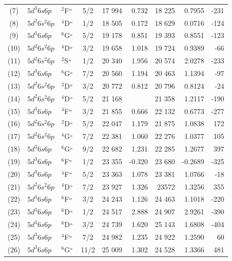 \documentclass[8pt,a4paper, twoside]{report}
\begin{document}
\begin{table}[p!]
\begin{center}
\begin{tabular}{cl@{\hspace{0.5cm}}l@{\hspace{0.5cm}}c@{\hspace{0.5cm}}r@{\hspace{0.5cm}}r@{\hspace{0.5cm}}r@{\hspace{0.5cm}}r@{\hspace{0.5cm}}r}
(7)  &$5d^3 6s 6p$ & $^2$F$^{\rm_o}$  & 5/2 & 17 994 & 0.732 &  18 225 &   0.7955  & -231\\
(8)  &$5d^2 6s^2 6p$ & $^4$D$^{\rm_o}$  & 1/2 & 18 505 & 0.172 & 18 629 &   0.0716  & -124\\
(9)  &$5d^3 6s 6p$ & $^6$G$^{\rm_o}$  & 5/2 & 19 178 & 0.851 & 19 393 &   0.8551 &  -123\\
(10)  &$5d^2 6s^2 6p$ & $^4$D$^{\rm_o}$  & 3/2 & 19 658 & 1.018 & 19 724 &   0.9389 & -66\\
(11)  &$5d^2 6s^2 6p$ & $^2$S$^{\rm_o}$  & 1/2 & 20 340 & 1.956 & 20 574 &   2.0278 & -233\\
(12)  &$5d^3 6s 6p$ & $^6$G$^{\rm_o}$  & 7/2 & 20 560 & 1.194 & 20 463 &   1.1394 & -97\\
(13)  &$5d^2 6s^2 6p$ & $^2$D$^{\rm_o}$  & 3/2 & 20 772 & 0.812 & 20 796 &     0.8124 & -24\\
(14)  &$5d^2 6s^2 6p$ & $^4$D$^{\rm_o}$  & 5/2 & 21 168 &   & 21 358 &   1.2117 &  -190\\
(15)  &$5d^3 6s 6p$ & $^4$F$^{\rm_o}$ & 3/2 & 21 855 & 0.666 & 22 132 & 0.6773 & -277 \\
(16)  &$5d^2 6s^2 6p$ & $^2$D$^{\rm_o}$ & 5/2 & 22 047 & 1.179 & 21 875 & 1.0838 & 172 \\
(17)  &$5d^2 6s^2 6p$ & $^4$G$^{\rm_o}$  & 7/2 & 22 381 & 1.060 & 22 276 & 1.0377 & 105 \\
(18)  &$5d^3 6s 6p$ & $^6$G$^{\rm_o}$ & 9/2 & 22 682 & 1.231 & 22 285 & 1.2677 & 397 \\
(19)  &$5d^3 6s 6p$ & $^6$F$^{\rm_o}$ & 1/2 & 23 355 & -0.320 & 23 680 & -0.2689 & -325 \\
(20)  &$5d^3 6s 6p$ & $^4$F$^{\rm_o}$ & 5/2 & 23 363 & 1.078 & 23 381 & 1.0766 & -18 \\
(21)  &$5d^2 6s^2 6p$ & $^4$D$^{\rm_o}$ & 7/2 & 23 927 & 1.326 & 23572 & 1.3256 & 355 \\
(22)  &$5d^3 6s 6p$ & $^6$F$^{\rm_o}$ & 3/2 & 24 243 & 1.126 & 24 463 & 1.1018 & -220 \\
(23)  &$5d^3 6s 6p$ & $^6$D$^{\rm_o}$ & 1/2 & 24 517 & 2.888 & 24 907 & 2.9261 & -390 \\
(24)  &$5d^3 6s 6p$ & $^6$D$^{\rm_o}$ & 3/2 & 24 739 & 1.620 & 25 143 & 1.6808& -404 \\
(25)  &$5d^3 6s 6p$ & $^4$F$^{\rm_o}$  & 7/2 & 24 982 & 1.235  & 24 922 & 1.2590 & 60 \\
(26)  &$5d^3 6s 6p$ & $^6$G$^{\rm_o}$ & 11/2 & 25 009 & 1.302 & 24 528 & 1.3366 & 481 \\

\end{tabular}
\end{center}
\end{table}
\end{document}

